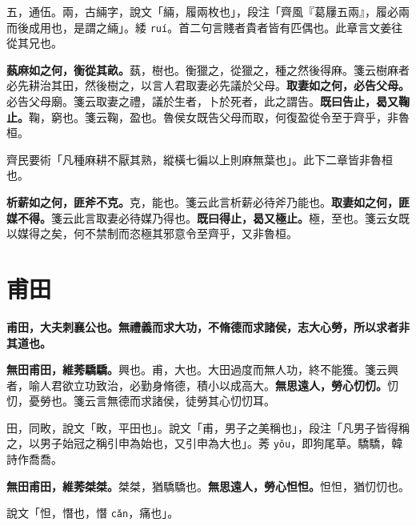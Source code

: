 \begin{quoting}五，通伍。兩，古緉字，說文「緉，履兩枚也」，段注「齊風『葛屨五兩』，履必兩而後成用也，是謂之緉」。緌 \texttt{ruí}。首二句言賤者貴者皆有匹偶也。此章言文姜往從其兄也。\end{quoting}

\textbf{蓺麻如之何，衡從其畝。}{\footnotesize 蓺，樹也。衡獵之，從獵之，種之然後得麻。箋云樹麻者必先耕治其田，然後樹之，以言人君取妻必先議於父母。}\textbf{取妻如之何，必告父母。}{\footnotesize 必告父母廟。箋云取妻之禮，議於生者，卜於死者，此之謂告。}\textbf{既曰告止，曷又鞠止。}{\footnotesize 鞠，窮也。箋云鞠，盈也。魯侯女既告父母而取，何復盈從令至于齊乎，非魯桓。}

\begin{quoting}齊民要術「凡種麻耕不厭其熟，縱橫七徧以上則麻無葉也」。此下二章皆非魯桓也。\end{quoting}

\textbf{析薪如之何，匪斧不克。}{\footnotesize 克，能也。箋云此言析薪必待斧乃能也。}\textbf{取妻如之何，匪媒不得。}{\footnotesize 箋云此言取妻必待媒乃得也。}\textbf{既曰得止，曷又極止。}{\footnotesize 極，至也。箋云女既以媒得之矣，何不禁制而恣極其邪意令至齊乎，又非魯桓。}

\section{甫田}


\textbf{甫田，大夫刺襄公也。無禮義而求大功，不脩德而求諸侯，志大心勞，所以求者非其道也。}

\textbf{無田甫田，維莠驕驕。}{\footnotesize 興也。甫，大也。大田過度而無人功，終不能獲。箋云興者，喻人君欲立功致治，必勤身脩德，積小以成高大。}\textbf{無思遠人，勞心忉忉。}{\footnotesize 忉忉，憂勞也。箋云言無德而求諸侯，徒勞其心忉忉耳。}

\begin{quoting}田，同畋，說文「畋，平田也」。說文「甫，男子之美稱也」，段注「凡男子皆得稱之，以男子始冠之稱引申為始也，又引申為大也」。莠 \texttt{yǒu}，即狗尾草。驕驕，韓詩作喬喬。\end{quoting}

\textbf{無田甫田，維莠桀桀。}{\footnotesize 桀桀，猶驕驕也。}\textbf{無思遠人，勞心怛怛。}{\footnotesize 怛怛，猶忉忉也。}

\begin{quoting}說文「怛，憯也，憯 \texttt{cǎn}，痛也」。\end{quoting}

